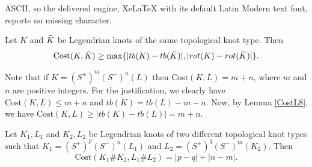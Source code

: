 \documentclass[10pt,a4paper]{amsart}
\DeclarePairedDelimiter{\abs}{\lvert}{\rvert}%
\newcommand{\Cost}{\text{Cost}}
\begin{document}
ASCII, so the delivered engine, XeLaTeX with its default Latin Modern text font, reports no missing character.
\begin{Lemma}\label{CostL8}
    Let $K$ and $\Tilde{K}$ be Legendrian knots of the same topological knot type. Then $$\Cost(K,\Tilde{K})\geq \max\{\abs{tb(K)-tb(\Tilde{K})},\abs{rot(K)-rot(\Tilde{K})}\}.$$
\end{Lemma}

\begin{remark}\label{NewRemark2}
 Note that if $K=(S^+)^m(S^-)^n(L)$ then $\Cost(K,L)=m+n$, where $m$ and $n$ are positive integers. For the justification, we clearly have $
   \Cost(K,L)\leq m+n$ and $tb(K)=tb(L)-m-n$. Now, by Lemma \ref{CostL8}, we have $\Cost(K,L)\geq |tb(K)-tb(L)|= m+n$.
\end{remark}

\begin{Lemma}\label{CostL21}
Let $K_1,L_1$ and $K_2,L_2$ be Legendrian knots of two different topological knot types such that $K_1=(S^+)^p(S^-)^n(L_1)$ and $ L_2=(S^+)^q(S^-)^{m}(K_2)$. Then $$\Cost(K_1\#K_2,L_1\#L_2)=|p-q|+|n-m|.$$
\end{Lemma}
\end{document}
